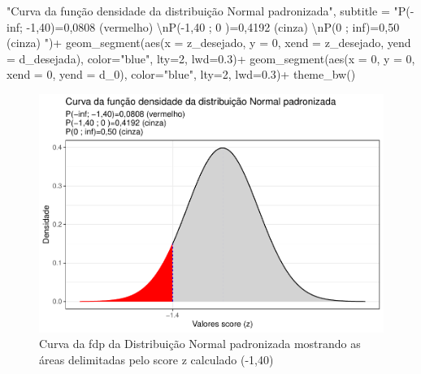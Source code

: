 \documentclass[
]{book}
\newenvironment{Shaded}{\begin{snugshade}}{\end{snugshade}}
\newcommand{\AttributeTok}[1]{\textcolor[rgb]{0.77,0.63,0.00}{#1}}
\newcommand{\DecValTok}[1]{\textcolor[rgb]{0.00,0.00,0.81}{#1}}
\newcommand{\FloatTok}[1]{\textcolor[rgb]{0.00,0.00,0.81}{#1}}
\newcommand{\FunctionTok}[1]{\textcolor[rgb]{0.00,0.00,0.00}{#1}}
\newcommand{\NormalTok}[1]{#1}
\newcommand{\SpecialCharTok}[1]{\textcolor[rgb]{0.00,0.00,0.00}{#1}}
\newcommand{\StringTok}[1]{\textcolor[rgb]{0.31,0.60,0.02}{#1}}
\begin{document}
\begin{Shaded}
\begin{Highlighting}[]
      \StringTok{"Curva da função densidade da distribuição Normal padronizada"}\NormalTok{, }
      \AttributeTok{subtitle =} \StringTok{"P({-}inf; {-}1,40)=0,0808 (vermelho) }\SpecialCharTok{\textbackslash{}n}\StringTok{P({-}1,40 ; 0 )=0,4192 (cinza) }\SpecialCharTok{\textbackslash{}n}\StringTok{P(0 ; inf)=0,50 (cinza) "}\NormalTok{)}\SpecialCharTok{+}
  \FunctionTok{geom\_segment}\NormalTok{(}\FunctionTok{aes}\NormalTok{(}\AttributeTok{x =}\NormalTok{ z\_desejado, }\AttributeTok{y =} \DecValTok{0}\NormalTok{, }\AttributeTok{xend =}\NormalTok{ z\_desejado, }\AttributeTok{yend =}\NormalTok{ d\_desejada), }\AttributeTok{color=}\StringTok{"blue"}\NormalTok{, }\AttributeTok{lty=}\DecValTok{2}\NormalTok{, }\AttributeTok{lwd=}\FloatTok{0.3}\NormalTok{)}\SpecialCharTok{+}
  \FunctionTok{geom\_segment}\NormalTok{(}\FunctionTok{aes}\NormalTok{(}\AttributeTok{x =} \DecValTok{0}\NormalTok{, }\AttributeTok{y =} \DecValTok{0}\NormalTok{, }\AttributeTok{xend =} \DecValTok{0}\NormalTok{, }\AttributeTok{yend =}\NormalTok{ d\_0), }\AttributeTok{color=}\StringTok{"blue"}\NormalTok{, }\AttributeTok{lty=}\DecValTok{2}\NormalTok{, }\AttributeTok{lwd=}\FloatTok{0.3}\NormalTok{)}\SpecialCharTok{+}
  \FunctionTok{theme\_bw}\NormalTok{()}
\end{Highlighting}
\end{Shaded}

\begin{figure}[H]

{\centering \includegraphics{apostila_files/figure-latex/fig24-1} 

}

\caption{Curva da fdp da Distribuição Normal padronizada mostrando as áreas delimitadas pelo score z calculado (-1,40)}\label{fig:fig24}
\end{figure}
\end{document}
